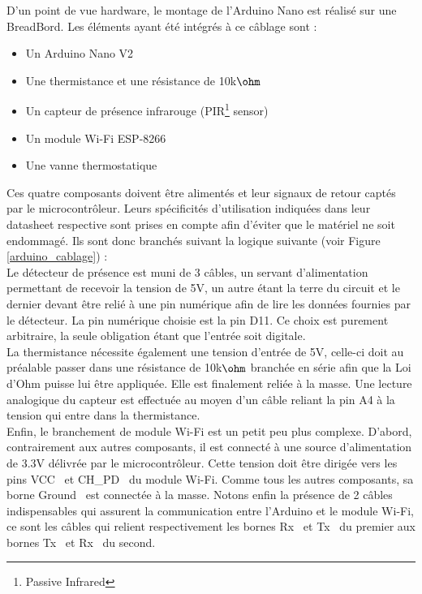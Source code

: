 \documentclass[11pt,a4paper,11pt]{report}
\begin{document}
D’un point de vue hardware, le montage de l’Arduino Nano est réalisé sur une BreadBord. Les éléments ayant été intégrés à ce câblage sont :\newline
\begin{itemize}
	\item Un Arduino Nano V2 \cite{ar1} \newline
    \item Une thermistance et une résistance de 10k$\ohm$ \cite{datash} \newline
	\item Un capteur de présence infrarouge (PIR\footnote{Passive Infrared} sensor) \cite{ar3} \newline
	\item Un module Wi-Fi ESP-8266 \cite{ar4} \newline
	\item Une vanne thermostatique \newline
\end{itemize}

Ces quatre composants doivent être alimentés et leur signaux de retour captés par le microcontrôleur. Leurs spécificités d’utilisation indiquées dans leur datasheet respective sont prises en compte afin d’éviter que le matériel ne soit endommagé. Ils sont donc branchés suivant la logique suivante (voir Figure \ref{arduino_cablage}) :\\

	Le détecteur de présence est muni de 3 câbles, un servant d’alimentation permettant de recevoir la tension de 5V, un autre étant la terre du circuit et le dernier devant être relié à une pin numérique afin de lire les données fournies par le détecteur. La pin numérique choisie est la pin D11. Ce choix est purement arbitraire, la seule obligation étant que l'entrée soit digitale.\\

	La thermistance nécessite également une tension d’entrée de 5V, celle-ci doit au préalable passer dans une résistance de 10k$\ohm$ branchée en série afin que la Loi d'Ohm puisse lui être appliquée. Elle est finalement reliée à la masse. Une lecture analogique du capteur est effectuée au moyen d'un câble reliant la pin A4 à la tension qui entre dans la thermistance.\\

Enfin, le branchement de module Wi-Fi est un petit peu plus complexe. D’abord, contrairement aux autres composants, il est connecté à une source d’alimentation de 3.3V délivrée par le microcontrôleur. Cette tension doit être dirigée vers les pins \og VCC \fg ~et \og CH\_PD \fg ~du module Wi-Fi. Comme tous les autres composants, sa borne \og Ground \fg ~est connectée à la masse. Notons enfin la présence de 2 câbles indispensables qui assurent la communication entre l'Arduino et le module Wi-Fi, ce sont les câbles qui relient respectivement les bornes \og Rx \fg ~et \og Tx \fg ~du premier aux bornes \og Tx \fg ~et \og Rx \fg ~du second.\\
\end{document}
